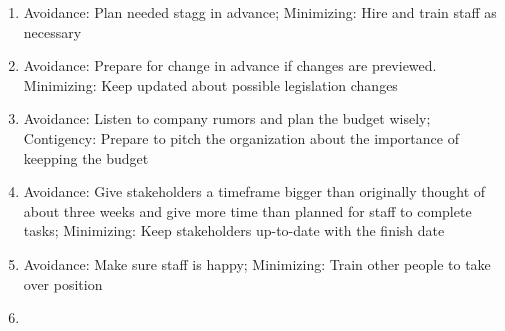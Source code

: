 \begin{enumerate}
    \item Avoidance: Plan needed stagg in advance; Minimizing: Hire and train staff as necessary
    \item Avoidance: Prepare for change in advance if changes are previewed. Minimizing: Keep updated about possible legislation changes
    \item Avoidance: Listen to company rumors and plan the budget wisely; Contigency: Prepare to pitch the organization about the importance of keepping the budget
    \item Avoidance: Give stakeholders a timeframe bigger than originally thought of about three weeks and give more time than planned for staff to complete tasks; Minimizing: Keep stakeholders up-to-date with the finish date
    \item Avoidance: Make sure staff is happy; Minimizing: Train other people to take over position
    \item
\end{enumerate}